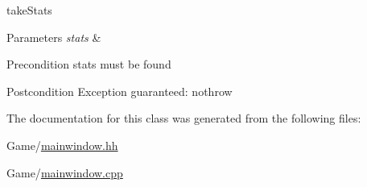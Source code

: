 take\-Stats 


\begin{DoxyParams}{Parameters}
{\em stats} & \\
\hline
\end{DoxyParams}
\begin{DoxyPrecond}{Precondition}
stats must be found 
\end{DoxyPrecond}
\begin{DoxyPostcond}{Postcondition}
Exception guaranteed\-: nothrow 
\end{DoxyPostcond}


The documentation for this class was generated from the following files\-:\begin{DoxyCompactItemize}
\item 
Game/\hyperlink{mainwindow_8hh}{mainwindow.\-hh}\item 
Game/\hyperlink{mainwindow_8cpp}{mainwindow.\-cpp}\end{DoxyCompactItemize}
